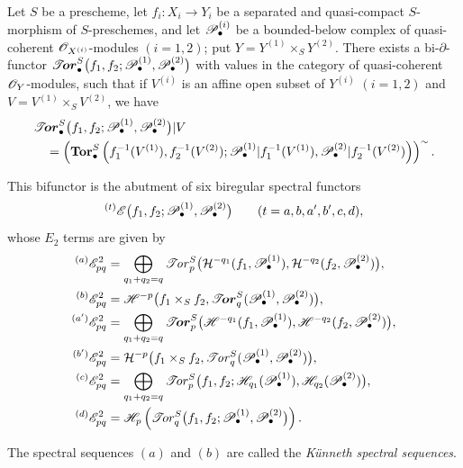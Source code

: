 \begin{theorem}[6.7.3]
\label{III.6.7.3}
Let $S$ be a prescheme, let
$f_i:X_i\to Y_i$ be a separated and quasi-compact
$S$-morphism of $S$-preschemes, and let
$\mathscr{P}_\bullet^{(i)}$ be a bounded-below complex of
quasi-coherent $\mathscr{O}_{X^{(i)}}$-modules $(i=1,2)$; put $Y=Y^{(1)}\times_SY^{(2)}$.
There exists a bi-$\partial$-functor $\boldsymbol{\mathscr{T}\!or}_\bullet^S
\bigl(
f_1,f_2;
\mathscr{P}_\bullet^{(1)},\mathscr{P}_\bullet^{(2)}
\bigr)$
with values in the category of quasi-coherent
$\mathscr{O}_Y$-modules, such that if $V^{(i)}$ is an affine open subset of
$Y^{(i)}$ $(i=1,2)$ and
$V=V^{(1)}\times_SV^{(2)}$, we have
\[
\begin{split}
  &\boldsymbol{\mathscr{T}\!or}_\bullet^S
  \bigl(
    f_1,f_2;
    \mathscr{P}_\bullet^{(1)},\mathscr{P}_\bullet^{(2)}
  \bigr)|V\\
  &\quad=
  \left(
    \mathbf{Tor}_\bullet^S
    \left(
      f_1^{-1}(V^{(1)}),f_2^{-1}(V^{(2)});
      \mathscr{P}_\bullet^{(1)}|f_1^{-1}(V^{(1)}),
      \mathscr{P}_\bullet^{(2)}|f_2^{-1}(V^{(2)})
    \right)
  \right)^{\sim} .
\end{split}
\]

This bifunctor is the abutment of six biregular spectral
functors
\[
  {}^{(t)}\mathscr{E}
  \bigl(
    f_1,f_2;
    \mathscr{P}_\bullet^{(1)},\mathscr{P}_\bullet^{(2)}
  \bigr)
  \qquad(t=a,b,a',b',c,d),
\]
whose $E_2$ terms are given by
\[
\begin{aligned}
  {}^{(a)}\mathscr{E}_{pq}^2
  &=
  \bigoplus_{q_1+q_2=q}
  \mathscr{T}\!\mathit{or}_p^S
  \bigl(
    \mathcal{H}^{-q_1}(f_1,\mathscr{P}_\bullet^{(1)}),
    \mathcal{H}^{-q_2}(f_2,\mathscr{P}_\bullet^{(2)})
  \bigr),\\
  {}^{(b)}\mathscr{E}_{pq}^2
  &=
  \mathscr{H}^{-p}
  \bigl(
    f_1\times_Sf_2,
    \boldsymbol{\mathscr{T}\!or}_q^S
    (\mathscr{P}_\bullet^{(1)},\mathscr{P}_\bullet^{(2)})
  \bigr),\\
  {}^{(a')}\mathscr{E}_{pq}^2
  &=
  \bigoplus_{q_1+q_2=q}
  \boldsymbol{\mathscr{T}\!or}_p^S
  \bigl(
    \mathscr{H}^{-q_1}(f_1,\mathscr{P}_\bullet^{(1)}),
    \mathscr{H}^{-q_2}(f_2,\mathscr{P}_\bullet^{(2)})
  \bigr),\\
  {}^{(b')}\mathscr{E}_{pq}^2
  &=
  \mathcal{H}^{-p}
  \bigl(
    f_1\times_Sf_2,
    \mathscr{T}\!\mathit{or}_q^S
    (\mathscr{P}_\bullet^{(1)},\mathscr{P}_\bullet^{(2)})
  \bigr),\\
  {}^{(c)}\mathscr{E}_{pq}^2
  &=
  \bigoplus_{q_1+q_2=q}
  \mathscr{T}\!or_p^S
  \bigl(
    f_1,f_2;
    \mathscr{H}_{q_1}(\mathscr{P}_\bullet^{(1)}),
    \mathscr{H}_{q_2}(\mathscr{P}_\bullet^{(2)})
  \bigr),\\
  {}^{(d)}\mathscr{E}_{pq}^2
  &=
  \mathscr{H}_p
  \left(
    \mathscr{T}\!or_q^S
    \bigl(
      f_1,f_2;
      \mathscr{P}_\bullet^{(1)},\mathscr{P}_\bullet^{(2)}
    \bigr)
  \right).
\end{aligned}
\]
\end{theorem}
\noindent The spectral sequences $(a)$ and $(b)$ are
called the \emph{K\"unneth spectral sequences}.

